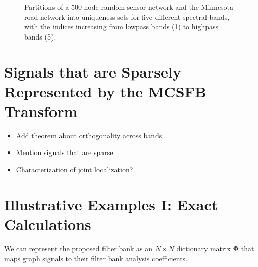 \documentclass[journal, 10pt]{IEEEtran}
\begin{document}
\begin{figure}[tb]
\begin{minipage}[m]{0.46\linewidth}
\end{minipage}
\caption{Partitions of a 500 node random sensor network and the Minnesota road network \cite{gleich} into uniqueness sets for five different spectral bands, with the indices increasing from lowpass bands (1) to highpass bands (5).} \label{Fig:part_examples}
\end{figure} 

{\color{red}
\section{Signals that are Sparsely Represented by the MCSFB Transform}
\begin{itemize}
\item Add theorem about orthogonality across bands
\item Mention signals that are sparse
\item Characterization of joint localization?
\end{itemize}
}

\section{Illustrative Examples I: Exact Calculations}
We can represent the proposed filter bank as an $N \times N$ dictionary matrix $\boldsymbol{\Phi}$ that maps graph signals to their filter bank analysis coefficients. 
\end{document}

